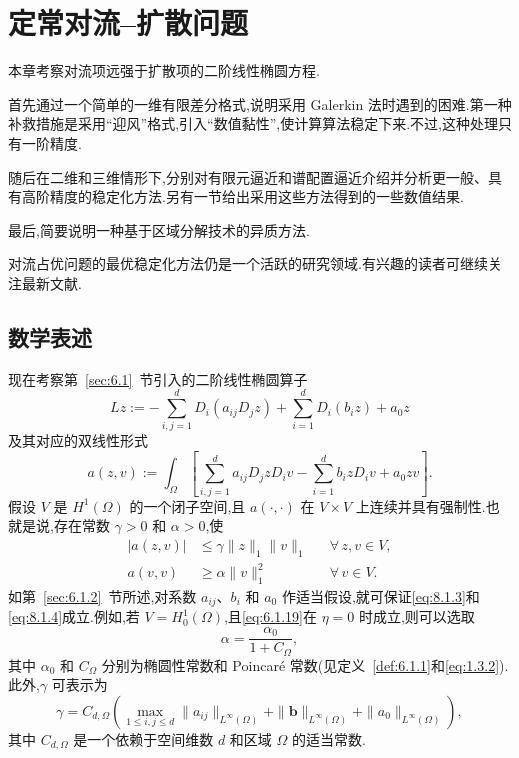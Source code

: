 \chapter{定常对流--扩散问题}\label{ch:8}

本章考察对流项远强于扩散项的二阶线性椭圆方程.

首先通过一个简单的一维有限差分格式,说明采用 Galerkin 法时遇到的困难.第一种补救措施是采用“迎风”格式,引入“数值黏性”,使计算算法稳定下来.不过,这种处理只有一阶精度.

随后在二维和三维情形下,分别对有限元逼近和谱配置逼近介绍并分析更一般、具有高阶精度的稳定化方法.另有一节给出采用这些方法得到的一些数值结果.

最后,简要说明一种基于区域分解技术的异质方法.

对流占优问题的最优稳定化方法仍是一个活跃的研究领域.有兴趣的读者可继续关注最新文献.

\section{数学表述}\label{sec:8.1}

现在考察第~\ref{sec:6.1}~节引入的二阶线性椭圆算子
\begin{equation}\label{eq:8.1.1}
  Lz:=-\sum_{i,j=1}^d D_i(a_{ij}D_jz)+\sum_{i=1}^d D_i(b_iz)+a_0z
\end{equation}
及其对应的双线性形式
\begin{equation}\label{eq:8.1.2}
  a(z,v):=\int_\Omega\left[\sum_{i,j=1}^d a_{ij}D_jzD_iv-\sum_{i=1}^d b_izD_iv+a_0zv\right].
\end{equation}
假设 \(V\) 是 \(H^1(\Omega)\) 的一个闭子空间,且 \(a(\cdot,\cdot)\) 在 \(V\times V\) 上连续并具有强制性.也就是说,存在常数 \(\gamma>0\) 和 \(\alpha>0\),使
\begin{align}
  |a(z,v)|&\le\gamma\|z\|_1\|v\|_1&&\forall\,z,v\in V,\label{eq:8.1.3}\\
  a(v,v)&\ge\alpha\|v\|_1^2&&\forall\,v\in V.\label{eq:8.1.4}
\end{align}
如第~\ref{sec:6.1.2}~节所述,对系数 \(a_{ij}\)、\(b_i\) 和 \(a_0\) 作适当假设,就可保证\eqref{eq:8.1.3}和\eqref{eq:8.1.4}成立.例如,若 \(V=H_0^1(\Omega)\),且\eqref{eq:6.1.19}在 \(\eta=0\) 时成立,则可以选取
\begin{equation}\label{eq:8.1.5}
  \alpha=\frac{\alpha_0}{1+C_\Omega},
\end{equation}
其中 \(\alpha_0\) 和 \(C_\Omega\) 分别为椭圆性常数和 Poincaré 常数(见定义~\ref{def:6.1.1}和\eqref{eq:1.3.2}).此外,\(\gamma\) 可表示为
\begin{equation}\label{eq:8.1.6}
  \gamma=C_{d,\Omega}\left(
    \max_{1\le i,j\le d}\|a_{ij}\|_{L^\infty(\Omega)}
      +\|\boldsymbol{b}\|_{L^\infty(\Omega)}+\|a_0\|_{L^\infty(\Omega)}\right),
\end{equation}
其中 \(C_{d,\Omega}\) 是一个依赖于空间维数 \(d\) 和区域 \(\Omega\) 的适当常数.

